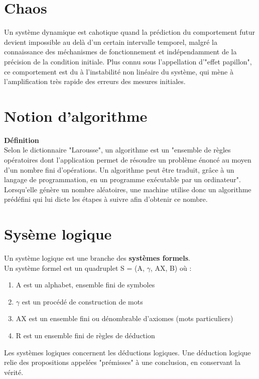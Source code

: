 \documentclass[a4paper, 10pt, titlepage]{report}
\begin{document}
\section*{Chaos}

Un système dynamique est cahotique quand la prédiction du comportement futur devient impossible au delà d'un certain intervalle temporel, malgré la connaissance des méchanismes de fonctionnement et indépendamment de la précision de la condition initiale. Plus connu sous l'appellation d'"effet papillon", ce comportement est du à l'instabilité non linéaire du système, qui mène à l'amplification très rapide des erreurs des mesures initiales.

\section*{Notion d'algorithme}

\textbf{Définition} \\
Selon le dictionnaire "Larousse", un algorithme est un "ensemble de règles opératoires dont l'application permet de résoudre un problème énoncé au moyen d'un nombre fini d'opérations. Un algorithme peut être traduit, grâce à un langage de programmation, en un programme exécutable par un ordinateur". Lorsqu'elle génère un nombre aléatoires, une machine utilise donc un algorithme prédéfini qui lui dicte les étapes à suivre afin d'obtenir ce nombre. 

\section*{Sysème logique}

Un système logique est une branche des \textbf{systèmes formels}. \\

Un système formel est un quadruplet S = (A, $\gamma$, AX, B) où : \\
\begin{enumerate}
	\item A est un alphabet, ensemble fini de symboles
	\item $\gamma$ est un procédé de construction de mots
	\item AX est un ensemble fini ou dénombrable d'axiomes (mots particuliers)
	\item R est un ensemble fini de règles de déduction 
\end{enumerate}

Les systèmes logiques concernent les déductions logiques. Une déduction logique relie des propositions appelées "prémisses" à une conclusion, en conservant la vérité.
\end{document}
